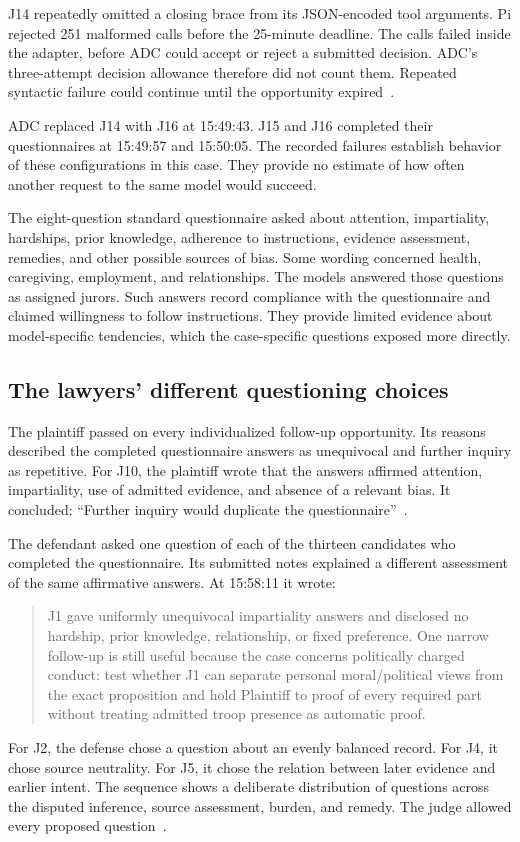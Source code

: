 J14 repeatedly omitted a closing brace from its JSON-encoded tool arguments.  Pi rejected 251 malformed calls before the 25-minute deadline.  The calls failed inside the adapter, before ADC could accept or reject a submitted decision.  ADC's three-attempt decision allowance therefore did not count them.  Repeated syntactic failure could continue until the opportunity expired~\cite[J14 process log and events 133--136]{record}.

ADC replaced J14 with J16 at 15:49:43.  J15 and J16 completed their questionnaires at 15:49:57 and 15:50:05.  The recorded failures establish behavior of these configurations in this case.  They provide no estimate of how often another request to the same model would succeed.

The eight-question standard questionnaire asked about attention, impartiality, hardships, prior knowledge, adherence to instructions, evidence assessment, remedies, and other possible sources of bias.  Some wording concerned health, caregiving, employment, and relationships.  The models answered those questions as assigned jurors.  Such answers record compliance with the questionnaire and claimed willingness to follow instructions.  They provide limited evidence about model-specific tendencies, which the case-specific questions exposed more directly.

\subsection{The lawyers' different questioning choices}

The plaintiff passed on every individualized follow-up opportunity.  Its reasons described the completed questionnaire answers as unequivocal and further inquiry as repetitive.  For J10, the plaintiff wrote that the answers affirmed attention, impartiality, use of admitted evidence, and absence of a relevant bias.  It concluded: “Further inquiry would duplicate the questionnaire”~\cite[events 142--181]{record}.

The defendant asked one question of each of the thirteen candidates who completed the questionnaire.  Its submitted notes explained a different assessment of the same affirmative answers.  At 15:58:11 it wrote:
\begin{quote}
J1 gave uniformly unequivocal impartiality answers and disclosed no hardship, prior knowledge, relationship, or fixed preference.  One narrow follow-up is still useful because the case concerns politically charged conduct: test whether J1 can separate personal moral/political views from the exact proposition and hold Plaintiff to proof of every required part without treating admitted troop presence as automatic proof.
\end{quote}
For J2, the defense chose a question about an evenly balanced record.  For J4, it chose source neutrality.  For J5, it chose the relation between later evidence and earlier intent.  The sequence shows a deliberate distribution of questions across the disputed inference, source assessment, burden, and remedy.  The judge allowed every proposed question~\cite[voir dire exchanges vdq-1--vdq-13]{record}.

